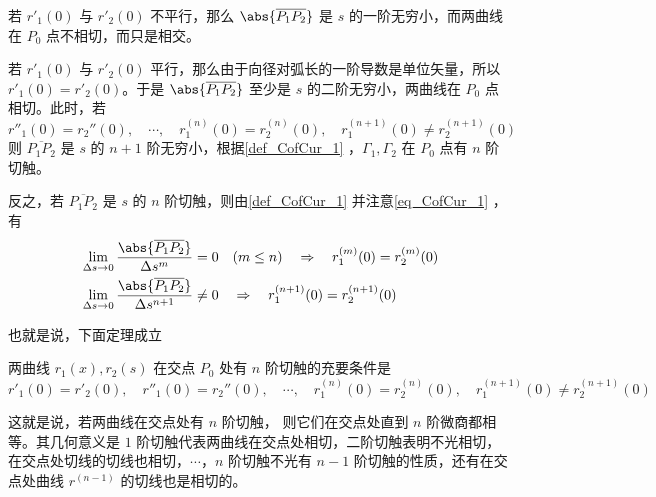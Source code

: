 若 $r'_1(0)$ 与 $r'_2(0)$ 不平行，那么 $\abs{\overline{P_1P_2}}$ 是 $s$ 的一阶无穷小，而两曲线在 $P_0$ 点不相切，而只是相交。

若 $r'_1(0)$ 与 $r'_2(0)$ 平行，那么由于向径对弧长的一阶导数是单位矢量，所以 $r'_1(0)=r'_2(0)$。于是 $\abs{\overline{P_1P_2}}$ 至少是 $s$ 的二阶无穷小，两曲线在 $P_0$ 点相切。此时，若
\begin{equation}
r''_1(0)=r_2''(0),\quad\cdots,\quad r^{(n)}_1(0)=r^{(n)}_2(0),\quad r^{(n+1)}_1(0)\neq r^{(n+1)}_2(0)
\end{equation}
则 $\overline{P_1P_2}$ 是 $s$ 的 $n+1$ 阶无穷小，根据\autoref{def_CofCur_1} ，$\Gamma_1,\Gamma_2$ 在 $P_0$ 点有 $n$ 阶切触。

反之，若 $\overline{P_1P_2}$ 是 $s$ 的 $n$ 阶切触，则由\autoref{def_CofCur_1} 并注意\autoref{eq_CofCur_1} ，有
\begin{equation}
\begin{aligned}
&\lim_{\Delta s\rightarrow0}\frac{\abs{\overline{P_1P_2}}}{\Delta s^{m}}=0\quad(m\leq n)\quad\Rightarrow \quad r^{(m)}_1(0)=r^{(m)}_2(0)\\
&\lim_{\Delta s\rightarrow0}\frac{\abs{\overline{P_1P_2}}}{\Delta s^{n+1}}\neq0\quad\Rightarrow\quad r^{(n+1)}_1(0)=r^{(n+1)}_2(0)
\end{aligned}
\end{equation}

也就是说，下面定理成立
\begin{theorem}{}
两曲线 $r_1(x),r_2(s)$ 在交点 $P_0$ 处有 $n$ 阶切触的充要条件是
\begin{equation}
r'_1(0)=r'_2(0),\quad r''_1(0)=r_2''(0),\quad\cdots,\quad r^{(n)}_1(0)=r^{(n)}_2(0),\quad r^{(n+1)}_1(0)\neq r^{(n+1)}_2(0)
\end{equation}
\end{theorem}
这就是说，若两曲线在交点处有 $n$ 阶切触， 则它们在交点处直到 $n$ 阶微商都相等。其几何意义是 $1$ 阶切触代表两曲线在交点处相切，二阶切触表明不光相切，在交点处切线的切线也相切，$\cdots$，$n$ 阶切触不光有 $n-1$ 阶切触的性质，还有在交点处曲线 $r^{(n-1)}$ 的切线也是相切的。   